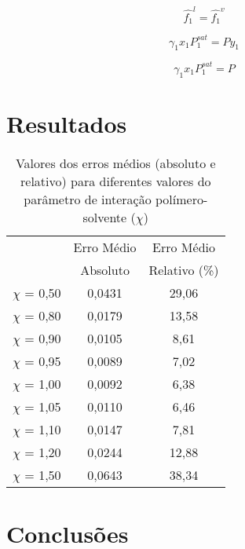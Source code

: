 \begin{equation}
\hat{f_1}^l = \hat{f_1}^v
\end{equation}

\begin{equation}
\gamma_1x_1P_1^{sat} = Py_1
\end{equation}

\begin{equation}
\gamma_1x_1P_1^{sat} = P
\end{equation}



\section{Resultados}

\begin{table}[htb]
\centering
\renewcommand{\arraystretch}{1.3}
\caption{Valores dos erros médios (absoluto e relativo) para diferentes valores
do parâmetro de interação polímero-solvente ($\chi$)}
\begin{tabular}{ccc}
\toprule
& {Erro Médio} & {Erro Médio} 	\\
& {Absoluto} & {Relativo (\%)}	 \\
\midrule
{$\chi$} = 0,50 & 0,0431 & 29,06 \\
{$\chi$} = 0,80 & 0,0179 & 13,58 \\
{$\chi$} = 0,90 & 0,0105 & 8,61  \\
{$\chi$} = 0,95 & 0,0089 & 7,02  \\
{$\chi$} = 1,00 & 0,0092 & 6,38  \\
{$\chi$} = 1,05 & 0,0110 & 6,46  \\
{$\chi$} = 1,10 & 0,0147 & 7,81  \\
{$\chi$} = 1,20 & 0,0244 & 12,88 \\
{$\chi$} = 1,50 & 0,0643 & 38,34 \\
\bottomrule
\end{tabular}
\label{tab:allresult}
\end{table}

\section{Conclusões}